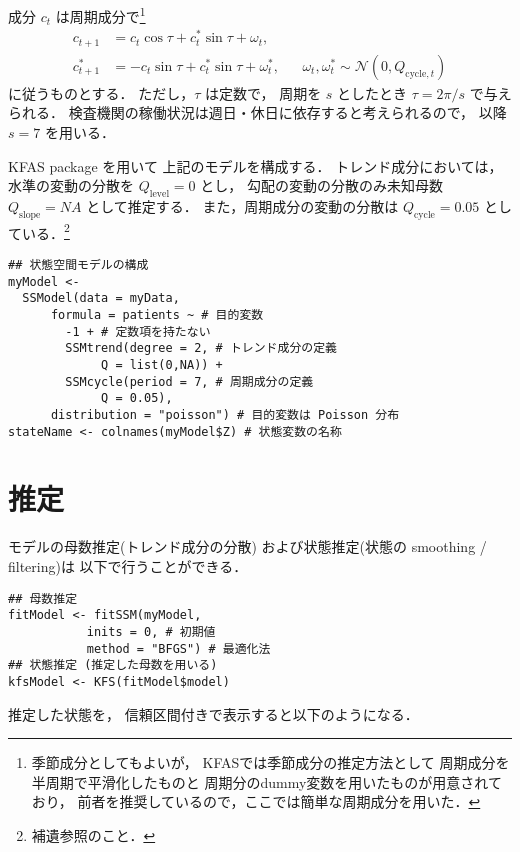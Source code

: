 \documentclass[10pt,oneside,fleqn]{scrartcl}
\begin{document}
成分 \(c_{t}\) は周期成分で\footnote{季節成分としてもよいが，
KFASでは季節成分の推定方法として
周期成分を半周期で平滑化したものと
周期分のdummy変数を用いたものが用意されており，
前者を推奨しているので，ここでは簡単な周期成分を用いた．}
\begin{align}
  c_{t+1}
  &=c_{t}\cos\tau+c^{*}_{t}\sin\tau+\omega_{t},\\
  c^{*}_{t+1}
  &=-c_{t}\sin\tau+c^{*}_{t}\sin\tau+\omega^{*}_{t},
  &&\omega_{t},\omega^{*}_{t}\sim\mathcal{N}(0,Q_{\mathrm{cycle},t})
\end{align}
に従うものとする．
ただし，\(\tau\) は定数で，
周期を \(s\) としたとき
\(\tau=2\pi/s\) で与えられる．
検査機関の稼働状況は週日・休日に依存すると考えられるので，
以降 \(s=7\) を用いる．

KFAS package を用いて
上記のモデルを構成する．
トレンド成分においては，
水準の変動の分散を \(Q_{\mathrm{level}}=0\)
とし，
勾配の変動の分散のみ未知母数 \(Q_{\mathrm{slope}}=NA\) として推定する．
また，周期成分の変動の分散は \(Q_{\mathrm{cycle}}=0.05\) としている．\footnote{補遺参照のこと．}

\begin{verbatim}
## 状態空間モデルの構成
myModel <-
  SSModel(data = myData, 
	  formula = patients ~ # 目的変数
	    -1 + # 定数項を持たない
	    SSMtrend(degree = 2, # トレンド成分の定義
		     Q = list(0,NA)) +
	    SSMcycle(period = 7, # 周期成分の定義
		     Q = 0.05),
	  distribution = "poisson") # 目的変数は Poisson 分布
stateName <- colnames(myModel$Z) # 状態変数の名称 
\end{verbatim}

\section{推定}
\label{sec:org21314e5}

モデルの母数推定(トレンド成分の分散)
および状態推定(状態の smoothing / filtering)は
以下で行うことができる．

\begin{verbatim}
## 母数推定
fitModel <- fitSSM(myModel, 
		   inits = 0, # 初期値
		   method = "BFGS") # 最適化法
## 状態推定 (推定した母数を用いる)
kfsModel <- KFS(fitModel$model)
\end{verbatim}

推定した状態を，
信頼区間付きで表示すると以下のようになる．

\begin{figure}[htbp]
  \centering
  \myGraph[1]{}
\end{figure}
\end{document}

